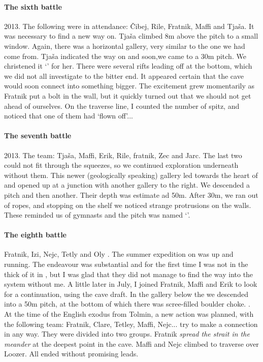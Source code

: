 \paragraph {The sixth battle} 2013. The following were in attendance: Čibej, Rile, Fratnik, Maffi and Tjaša. It was necessary to find a new way on. Tjaša climbed 8m above the  pitch to a small window. Again, there was a horizontal gallery, very similar to the one we had come from. Tjaša indicated the way on and soon,we came to a 30m pitch. We christened it `' for her. There were several rifts leading off at the bottom, which we did not all investigate to the bitter end. It appeared certain that the cave would soon connect into something bigger. The excitement grew momentarily as Fratnik put a bolt in the wall, but it quickly turned out that we should not get ahead of ourselves. On the traverse line, I counted the number of spitz, and noticed that one of them had `flown off'...

\paragraph{The seventh battle} 2013. The team: Tjaša, Maffi, Erik, Rile, fratnik, Zec and Jarc. The last two could not fit through the squeezes, so we continued exploration underneath  without them. This newer (geologically speaking) gallery led towards the heart of  and opened up at a junction with another gallery to the right. We descended a pitch and then another. Their depth was estimate ad 50m. After 30m, we ran out of ropes, and stopping on the shelf we noticed strange protrusions on the walls. These reminded us of gymnasts and the pitch was named `'.

\paragraph{The eighth battle} Fratnik, Izi, Nejc, Tetly and Oly . The summer expedition on  was up and running. The endeavour was substantial and for the first time I was not in the thick of it in , but I was glad that they did not manage to find the way into the system without me. A little later in July, I joined Fratnik, Maffi and Erik to look for a continuation, using the cave draft. In the gallery below the  we descended into a 50m pitch, at the bottom of which there was scree-filled boulder choke. . At the time of the English exodus from Tolmin, a new action was planned, with the following team: Fratnik, Clare, Tetley, Maffi, Nejc... try to make a connection in any way. They were divided into two groups. Fratnik \textit{spread the strait in the meander} at the deepest point in the cave. Maffi and Nejc climbed to traverse over Loozer. All ended without promising leads.

